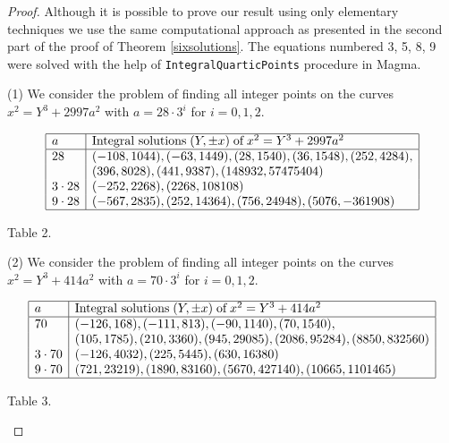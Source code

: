 \documentclass[10pt]{amsart}
\theoremstyle{plain}
\begin{document}
\begin{proof}
Although it is possible to prove our result using only elementary techniques we use the same computational approach as presented in the second part of the proof of Theorem \ref{sixsolutions}. The equations numbered 3, 5, 8, 9 were solved with the help of {\tt IntegralQuarticPoints} procedure in Magma.

(1) We consider the problem of finding all integer points on the curves $x^2=Y^3+2997a^2$ with $a=28\cdot 3^{i}$ for $i=0,1,2$.
\begin{center}
\begin{equation*}
\begin{array}{|l|l|}
  \hline
  
  a          & \mbox{Integral solutions}\;(Y, \pm x)\;\mbox{of}\; x^2=Y^3+2997a^2  \\
  \hline
  28          &(-108, 1044), (-63, 1449), (28, 1540), (36, 1548), (252, 4284), \\
                &(396, 8028), (441, 9387), (148932, 57475404) \\
  3\cdot 28   & (-252, 2268), (2268, 108108)\\
  9\cdot 28   & (-567, 2835), (252, 14364), (756, 24948), (5076, -361908)\\
   \hline
\end{array}
\end{equation*}
\end{center}
\begin{center}
Table 2.
\end{center}

(2) We consider the problem of finding all integer points on the curves $x^2=Y^3+414a^2$ with $a=70\cdot 3^{i}$ for $i=0,1,2$.
\begin{center}
\begin{equation*}
\begin{array}{|l|l|}
  \hline
  
  a          & \mbox{Integral solutions}\;(Y, \pm x)\;\mbox{of}\;x^2=Y^3+414a^2  \\
  \hline
  70          &(-126, 168), (-111, 813), (-90, 1140), (70, 1540), \\
                &(105, 1785), (210, 3360), (945, 29085), (2086, 95284), (8850, 832560)  \\
  3\cdot 70   & (-126, 4032), (225, 5445), (630, 16380)\\
  9\cdot 70   & (721, 23219), (1890, 83160), (5670, 427140), (10665, 1101465)\\
   \hline
\end{array}
\end{equation*}
\end{center}
\begin{center}
Table 3.
\end{center}


\end{proof}
\end{document}
